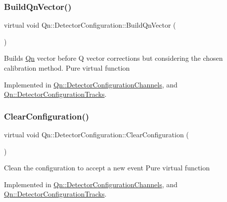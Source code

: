 \mbox{\label{classQn_1_1DetectorConfiguration_a7aaf10f6e30151dd142d59d5dff72e2d}} 
\subsubsection{\texorpdfstring{Build\+Qn\+Vector()}{BuildQnVector()}}
{\footnotesize\ttfamily virtual void Qn\+::\+Detector\+Configuration\+::\+Build\+Qn\+Vector (\begin{DoxyParamCaption}{ }\end{DoxyParamCaption})\hspace{0.3cm}{\ttfamily [pure virtual]}}

Builds \mbox{\hyperlink{namespaceQn}{Qn}} vector before Q vector corrections but considering the chosen calibration method. Pure virtual function 

Implemented in \mbox{\hyperlink{classQn_1_1DetectorConfigurationChannels_aa68804ba67cf6fdee8891e6aed0e14f7}{Qn\+::\+Detector\+Configuration\+Channels}}, and \mbox{\hyperlink{classQn_1_1DetectorConfigurationTracks_a9194c0e1f6e84a8c8fc249b05ee8afb5}{Qn\+::\+Detector\+Configuration\+Tracks}}.

\mbox{\label{classQn_1_1DetectorConfiguration_a94c21b39a4a3680675319aacf4a517f4}} 
\subsubsection{\texorpdfstring{Clear\+Configuration()}{ClearConfiguration()}}
{\footnotesize\ttfamily virtual void Qn\+::\+Detector\+Configuration\+::\+Clear\+Configuration (\begin{DoxyParamCaption}{ }\end{DoxyParamCaption})\hspace{0.3cm}{\ttfamily [pure virtual]}}

Clean the configuration to accept a new event Pure virtual function 

Implemented in \mbox{\hyperlink{classQn_1_1DetectorConfigurationChannels_a692b4880a3a694cf9a3ad860cb3f7b52}{Qn\+::\+Detector\+Configuration\+Channels}}, and \mbox{\hyperlink{classQn_1_1DetectorConfigurationTracks_aba7ffa70d60483d7e51460e4309b0fb2}{Qn\+::\+Detector\+Configuration\+Tracks}}.

